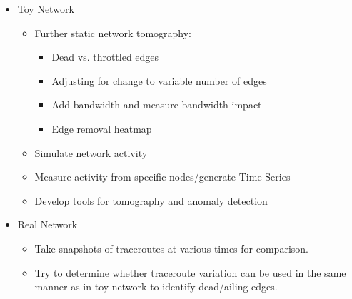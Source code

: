 \documentclass{weeklyreport}
\begin{document}
\begin{itemize}
	\item Toy Network
	\begin{itemize}
		\item Further static network tomography:
		\begin{itemize}
			\item Dead vs. throttled edges
			\item Adjusting for change to variable number of edges
			\item Add bandwidth and measure bandwidth impact
			\item Edge removal heatmap
		\end{itemize}
		\item Simulate network activity
		\item Measure activity from specific nodes/generate Time Series
		\item Develop tools for tomography and anomaly detection
	\end{itemize}
	\item Real Network
	\begin{itemize}
		\item Take snapshots of traceroutes at various times for comparison.
		\item Try to determine whether traceroute variation can be used in the same manner as in toy network to identify dead/ailing edges.
	\end{itemize}
\end{itemize}
\end{document}
